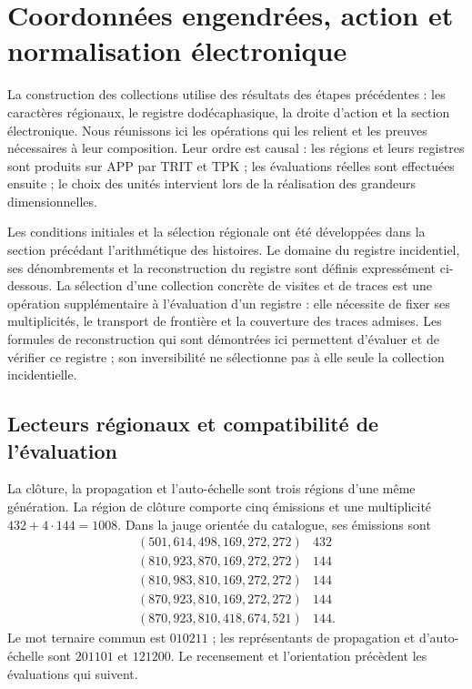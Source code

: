 \section{Coordonnées engendrées, action et normalisation électronique}
\label{vi:dep:seccion}\label{sec:k-registro}

La construction des collections utilise des résultats des étapes précédentes :
les caractères régionaux, le registre dodécaphasique, la droite d’action et la
section électronique. Nous réunissons ici les opérations qui les relient et les
preuves nécessaires à leur composition. Leur ordre est causal : les régions et leurs
registres sont produits sur APP par TRIT et TPK ; les évaluations réelles
sont effectuées ensuite ; le choix des unités intervient lors de la réalisation des
grandeurs dimensionnelles.

Les conditions initiales et la sélection régionale ont été développées dans
la section précédant l’arithmétique des histoires. Le domaine du registre
incidentiel, ses dénombrements et la reconstruction du registre sont définis
expressément ci-dessous. La sélection d’une collection concrète de
visites et de traces est une opération supplémentaire à l’évaluation d’un registre :
elle nécessite de fixer ses multiplicités, le transport de frontière et la
couverture des traces admises. Les formules de reconstruction qui sont
démontrées ici permettent d’évaluer et de vérifier ce registre ; son
inversibilité ne sélectionne pas à elle seule la collection incidentielle.

\subsection{Lecteurs régionaux et compatibilité de l’évaluation}
\label{vi:dep:regiones}

La clôture, la propagation et l’auto-échelle sont trois régions d’une même
génération. La région de clôture comporte cinq émissions et une multiplicité
\(432+4\cdot144=1008\). Dans la jauge orientée du catalogue, ses émissions
sont
\[
\begin{array}{c|r}
(501,614,498,169,272,272)&432\\
(810,923,870,169,272,272)&144\\
(810,983,810,169,272,272)&144\\
(870,923,810,169,272,272)&144\\
(870,923,810,418,674,521)&144.
\end{array}
\]
Le mot ternaire commun est \(010211\) ; les représentants de propagation
et d’auto-échelle sont \(201101\) et \(121200\). Le recensement et l’orientation
précèdent les évaluations qui suivent.

